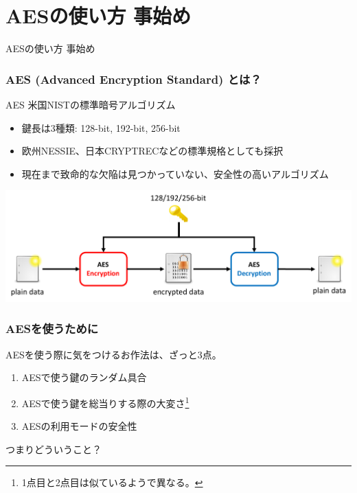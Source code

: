 \documentclass[12pt,dvipdfmx]{beamer}
\begin{document}
\section{AESの使い方 事始め}
\begin{frame}
\centering
{\Large AESの使い方 事始め}
\end{frame}

\begin{frame}
\frametitle{AES (Advanced Encryption Standard) とは？}
\begin{block}{AES}
米国NISTの標準暗号アルゴリズム\\
\begin{itemize}
 \item 鍵長は3種類: 128-bit, 192-bit, 256-bit
 \item 欧州NESSIE、日本CRYPTRECなどの標準規格としても採択
 \item 現在まで致命的な欠陥は見つかっていない、安全性の高いアルゴリズム
\end{itemize}
\end{block}
\begin{center}
\includegraphics[width=0.9\linewidth]{Figs/aes_flow.pdf}
\end{center}
\end{frame}


\begin{frame}
\frametitle{AESを使うために}
AESを使う際に気をつけるお作法は、ざっと3点。
\begin{enumerate}
 \item AESで使う鍵の\alert{ランダム具合}
 \item AESで使う鍵を\alert{総当りする際の大変さ}\footnote[frame]{1点目と2点目は似ているようで異なる。}
 \item AESの\alert{利用モードの安全性}
\end{enumerate}

\vspace{2ex}
つまりどういうこと？

\end{frame}
\end{document}
